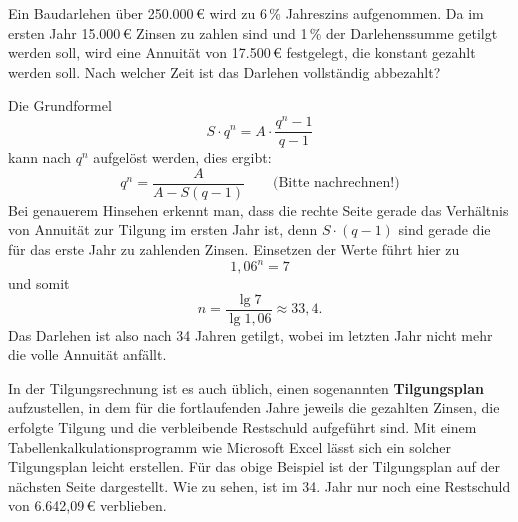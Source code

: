 Ein Baudarlehen über 250.000\,€ wird zu 6\,\% Jahreszins aufgenommen. Da im ersten Jahr 15.000\,€ Zinsen zu zahlen sind und 1\,\% der Darlehenssumme getilgt werden soll, wird eine Annuität von 17.500\,€ festgelegt, die konstant gezahlt werden soll. Nach welcher Zeit ist das Darlehen vollständig abbezahlt?

Die Grundformel
\[ S \cdot q^n = A \cdot \frac{q^n - 1}{q - 1} \]
kann nach $q^n$ aufgelöst werden, dies ergibt:
\[ q^n = \frac{A}{A - S(q - 1)} \qquad \text{(Bitte nachrechnen!)} \]
Bei genauerem Hinsehen erkennt man, dass die rechte Seite gerade das Verhältnis von Annuität zur Tilgung im ersten Jahr ist, denn $S \cdot (q - 1)$ sind gerade die für das erste Jahr zu zahlenden Zinsen. Einsetzen der Werte führt hier zu
\[ 1{,}06^n = 7 \]
und somit
\[ n = \frac{\lg 7}{\lg 1{,}06} \approx 33{,}4 . \]
Das Darlehen ist also nach 34 Jahren getilgt, wobei im letzten Jahr nicht mehr die volle Annuität anfällt.\beispielende

In der Tilgungsrechnung ist es auch üblich, einen sogenannten \textbf{Tilgungsplan} aufzustellen, in dem für die fortlaufenden Jahre jeweils die gezahlten Zinsen, die erfolgte Tilgung und die verbleibende Restschuld aufgeführt sind. Mit einem Tabellenkalkulationsprogramm wie Microsoft Excel lässt sich ein solcher Tilgungsplan leicht erstellen. Für das obige Beispiel ist der Tilgungsplan auf der nächsten Seite dargestellt. Wie zu sehen, ist im 34. Jahr nur noch eine Restschuld von 6.642{,}09\,€ verblieben.

